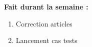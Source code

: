 \textbf{Fait durant la semaine :}
\begin{enumerate}[label=\textbullet]
	\item Correction articles
	\item Lancement cas tests
\end{enumerate}
